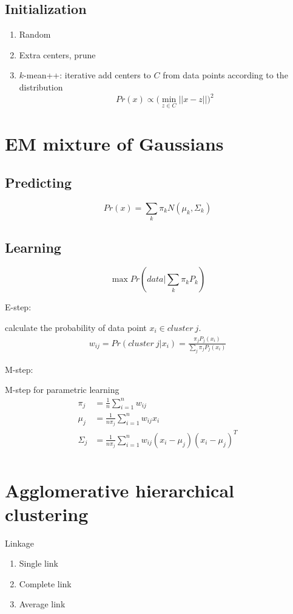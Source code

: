 \documentclass[a4paper]{report}
\begin{document}
\subsection{Initialization}
\begin{enumerate}
\item Random
\item Extra centers, prune
\item $k$-mean++: iterative add centers to $C$ from data points according to the distribution 
$$
Pr(x) \propto \big(\min_{z\in C}||x-z||\big)^2
$$


\end{enumerate}
\section{EM mixture of Gaussians}
\subsection{Predicting}
$$
Pr(x) = \sum_k \pi_k N(\mu_k, \Sigma_k)
$$

\subsection{Learning}
$$
\max Pr(data|\sum_k \pi_k P_k)
$$

E-step:

calculate the probability of data point $x_i \in cluster~j$. 
\begin{align*}
w_{ij} = Pr(cluster~j|x_i) = \frac{\pi_j P_j(x_i)}{\sum_j \pi_j P_j(x_i)}
\end{align*}

M-step:

M-step for parametric learning 
\begin{align*}
\pi_j &= \frac{1}{n} \sum_{i=1}^n w_{ij} \\
\mu_j &= \frac{1}{n\pi_j} \sum_{i=1}^n w_{ij} x_i \\
\Sigma_j &= \frac{1}{n\pi_j} \sum_{i=1}^n w_{ij}(x_i-\mu_j)(x_i-\mu_j)^T
\end{align*}
\begin{align*}

\end{align*}
\section{Agglomerative hierarchical clustering}
Linkage
\begin{enumerate}
\item Single link
\item Complete link 
\item Average link 
\end{enumerate}
\end{document}
